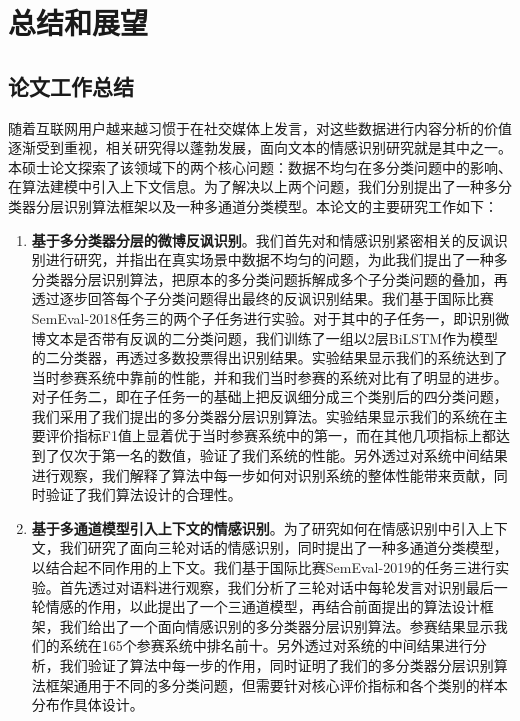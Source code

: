 \chapter{总结和展望}
\label{cha:conclusion}

\section{论文工作总结}

随着互联网用户越来越习惯于在社交媒体上发言，对这些数据进行内容分析的价值逐渐受到重视，相关研究得以蓬勃发展，面向文本的情感识别研究就是其中之一。本硕士论文探索了该领域下的两个核心问题：数据不均匀在多分类问题中的影响、在算法建模中引入上下文信息。为了解决以上两个问题，我们分别提出了一种多分类器分层识别算法框架以及一种多通道分类模型。本论文的主要研究工作如下：

\begin{enumerate}

\item {\bf 基于多分类器分层的微博反讽识别}。我们首先对和情感识别紧密相关的反讽识别进行研究，并指出在真实场景中数据不均匀的问题，为此我们提出了一种多分类器分层识别算法，把原本的多分类问题拆解成多个子分类问题的叠加，再透过逐步回答每个子分类问题得出最终的反讽识别结果。我们基于国际比赛SemEval-2018任务三的两个子任务进行实验。对于其中的子任务一，即识别微博文本是否带有反讽的二分类问题，我们训练了一组以2层BiLSTM作为模型的二分类器，再透过多数投票得出识别结果。实验结果显示我们的系统达到了当时参赛系统中靠前的性能，并和我们当时参赛的系统对比有了明显的进步。对子任务二，即在子任务一的基础上把反讽细分成三个类别后的四分类问题，我们采用了我们提出的多分类器分层识别算法。实验结果显示我们的系统在主要评价指标F1值上显着优于当时参赛系统中的第一，而在其他几项指标上都达到了仅次于第一名的数值，验证了我们系统的性能。另外透过对系统中间结果进行观察，我们解释了算法中每一步如何对识别系统的整体性能带来贡献，同时验证了我们算法设计的合理性。

\item {\bf 基于多通道模型引入上下文的情感识别}。为了研究如何在情感识别中引入上下文，我们研究了面向三轮对话的情感识别，同时提出了一种多通道分类模型，以结合起不同作用的上下文。我们基于国际比赛SemEval-2019的任务三进行实验。首先透过对语料进行观察，我们分析了三轮对话中每轮发言对识别最后一轮情感的作用，以此提出了一个三通道模型，再结合前面提出的算法设计框架，我们给出了一个面向情感识别的多分类器分层识别算法。参赛结果显示我们的系统在165个参赛系统中排名前十。另外透过对系统的中间结果进行分析，我们验证了算法中每一步的作用，同时证明了我们的多分类器分层识别算法框架通用于不同的多分类问题，但需要针对核心评价指标和各个类别的样本分布作具体设计。

\end{enumerate}

